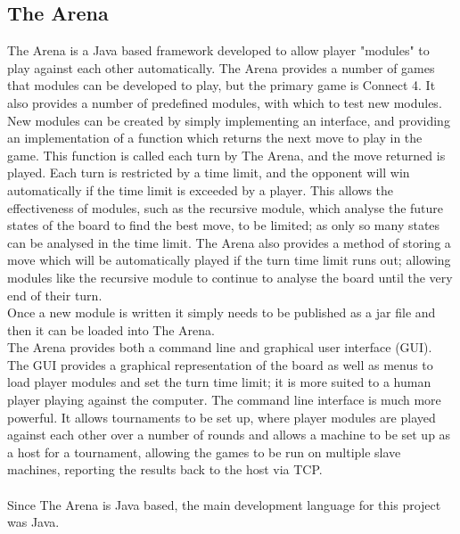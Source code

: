 \subsection{The Arena}
The Arena is a Java based framework developed to allow player "modules" to play against each other automatically. The Arena provides a number of games that modules can be developed to play, but the primary game is Connect 4. It also provides a number of predefined modules, with which to test new modules. New modules can be created by simply implementing an interface, and providing an implementation of a function which returns the next move to play in the game. This function is called each turn by The Arena, and the move returned is played. Each turn is restricted by a time limit, and the opponent will win automatically if the time limit is exceeded by a player. This allows the effectiveness of modules, such as the recursive module, which analyse the future states of the board to find the best move, to be limited; as only so many states can be analysed in the time limit. The Arena also provides a method of storing a move which will be automatically played if the turn time limit runs out; allowing modules like the recursive module to continue to analyse the board until the very end of their turn. 
\\Once a new module is written it simply needs to be published as a jar file and then it can be loaded into The Arena. 
\\The Arena provides both a command line and graphical user interface (GUI). The GUI provides a graphical representation of the board as well as menus to load player modules and set the turn time limit; it is more suited to a human player playing against the computer. The command line interface is much more powerful. It allows tournaments to be set up, where player modules are played against each other over a number of rounds and allows a machine to be set up as a host for a tournament, allowing the games to be run on multiple slave machines, reporting the results back to the host via TCP.
\\\\Since The Arena is Java based, the main development language for this project was Java.

